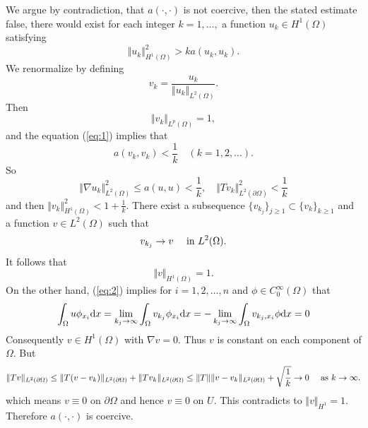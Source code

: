 \documentclass[11pt,letterpaper]{article}
\begin{document}
We argue by contradiction, that $a(\cdot, \cdot)$ is not coercive,
then the stated estimate false,
there would exist for each integer $k=1,\ldots,$ a function $u_k\in H^1(\Omega)$ satisfying
\begin{equation}\label{eq:1}
  \Vert u_k\Vert^2_{H^1(\Omega)}>k a(u_k,u_k).
\end{equation}
We renormalize by defining
\begin{displaymath}
  v_k=\frac{u_k}{\Vert u_k\Vert_{L^2(\Omega)}}.
\end{displaymath}
Then
\begin{displaymath}
  \Vert v_k\Vert_{L^p(\Omega)}=1,
\end{displaymath}
and the equation (\ref{eq:1}) implies that
\begin{displaymath}
  a(v_k,v_k)< \frac{1}{k}\quad (k=1,2,\ldots).
\end{displaymath}
So
\begin{equation}\label{eq:2}
  \Vert \nabla u_k\Vert_{L^2(\Omega)}^2\leq a(u,u)< \frac{1}{k},\quad
  \Vert Tv_k\Vert_{L^2(\partial \Omega)}^2< \frac{1}{k}
\end{equation}
and then $\Vert v_k\Vert^2_{H^1(\Omega)}< 1+\frac{1}{k}.$
There exist a subsequence $\{v_{k_j}\}_{j\geq 1}\subset \{v_k\}_{k\geq 1}$
and a function $v\in L^2(\Omega)$
such that
\begin{displaymath}
  v_{k_j}\rightarrow v\quad \textmd{ in }L^2(\Omega).
\end{displaymath}
It follows that
\begin{displaymath}
  \Vert v\Vert_{H^1(\Omega)}= 1.
\end{displaymath}
On the other hand,
(\ref{eq:2}) implies for $i=1,2,\ldots,n$ and  $\phi\in C^\infty_0(\Omega)$ that
\begin{displaymath}
  \int_\Omega u\phi_{x_i} \textmd{d}x=
  \lim_{k_j\rightarrow\infty}\int_{\Omega} v_{k_j}\phi_{x_i}\textmd{d}x
  =- \lim_{k_j\rightarrow\infty}\int_{\Omega} v_{k_j,x_i}\phi\textmd{d}x=0
\end{displaymath}
Consequently $v\in H^1(\Omega)$ with $\nabla v=0$.
Thus $v$ is constant on each component of $\Omega$.
But
\begin{displaymath}
  \Vert Tv\Vert_{L^2(\partial \Omega)}
  \leq \Vert T(v-v_k)\Vert_{L^2(\partial \Omega)}+\Vert Tv_k\Vert_{L^2(\partial \Omega)}
  \leq \Vert T\Vert \Vert v-v_k\Vert_{L^2(\partial \Omega)}+\sqrt{\frac{1}{k}}
  \rightarrow 0\quad \textmd{ as }k\rightarrow \infty.
\end{displaymath}
which means $v\equiv 0$ on $\partial \Omega$ and hence $v\equiv 0$ on $U$.
This contradicts to $\Vert v\Vert_{H^1}=1$.
Therefore $a(\cdot,\cdot)$ is coercive.
\end{document}
